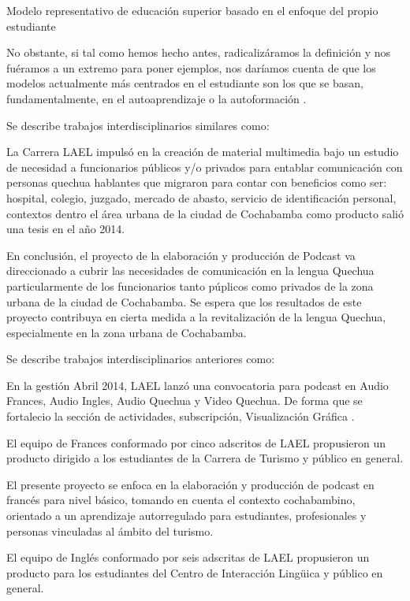 Modelo representativo de educaci\'{o}n superior basado en el enfoque del propio
estudiante

No obstante, si tal como hemos hecho antes, radicaliz\'{a}ramos la definici\'{o}n
y nos fu\'{e}ramos a un extremo para poner ejemplos, nos dar\'{i}amos cuenta de
que los modelos actualmente m\'{a}s centrados en el estudiante son los que se 
basan, fundamentalmente, en el autoaprendizaje o la autoformaci\'{o}n
.\cite{duart2000aprender}

Se describe trabajos interdisciplinarios similares como: 

La Carrera LAEL impuls\'{o} en la creaci\'{o}n de material multimedia bajo un 
estudio de necesidad a funcionarios p\'{u}blicos y/o privados para entablar
comunicaci\'{o}n con personas quechua hablantes que migraron para contar con
beneficios como ser: hospital, colegio, juzgado, mercado de abasto, servicio de
identificaci\'{o}n personal, contextos dentro el \'{a}rea urbana de la ciudad de 
Cochabamba como producto sali\'{o} una tesis en el a\~{n}o 2014.

En conclusi\'{o}n, el proyecto de la elaboraci\'{o}n y producci\'{o}n de Podcast
va direccionado a cubrir las necesidades de comunicaci\'{o}n en la lengua Quechua
particularmente de los funcionarios tanto p\'{u}plicos como privados de la zona
urbana de la ciudad de Cochabamba. Se espera que los resultados de este proyecto
contribuya en cierta medida a la revitalizaci\'{o}n de la lengua Quechua,
especialmente en la zona urbana de Cochabamba.\cite{CHLMV2014}

Se describe trabajos interdisciplinarios anteriores como:

En la gesti\'{o}n Abril 2014, LAEL lanz\'{o} una convocatoria para podcast en
Audio Frances, Audio Ingles, Audio Quechua y Video Quechua. De forma que se
fortalecio la secci\'{o}n de actividades, subscripci\'{o}n, Visualizaci\'{o}n
Gr\'{a}fica .

El equipo de Frances conformado por cinco adscritos de LAEL propusieron un
producto dirigido a los estudiantes de la Carrera de Turismo y p\'{u}blico en general.

El presente proyecto se enfoca en la elaboraci\'{o}n y producci\'{o}n de podcast
en franc\'{e}s para nivel b\'{a}sico, tomando en cuenta el contexto cochabambino,
orientado a un aprendizaje autorregulado para estudiantes, profesionales y 
personas vinculadas al \'{a}mbito del turismo. \cite{CMNPZ2015}

El equipo de Ingl\'{e}s conformado por seis adscritas de LAEL propusieron un
producto para los estudiantes del Centro de Interacci\'{o}n Ling\"{u}ica y
p\'{u}blico en general.


